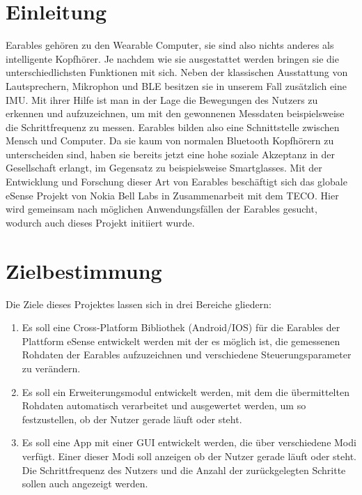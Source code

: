 \documentclass[a4paper,12pt]{article}
\title{\projektName}
\date{\today}
\begin{document}
 \setcounter{page}{2}
 \tableofcontents          %
 \clearpage


\section{Einleitung}
\Gls{Earables} gehören zu den \Gls{Wearable Computer}, sie sind also nichts anderes als intelligente Kopfhörer. Je nachdem wie sie ausgestattet werden bringen sie die unterschiedlichsten Funktionen mit sich. Neben der klassischen Ausstattung von Lautsprechern, Mikrophon und \gls{BLE} besitzen sie in unserem Fall zusätzlich eine \Gls{IMU}. Mit ihrer Hilfe ist man in der Lage die Bewegungen des Nutzers zu erkennen und aufzuzeichnen, um mit den gewonnenen Messdaten  beispielsweise die \Gls{Schrittfrequenz} zu messen.  \Gls{Earables} bilden also eine Schnittstelle zwischen Mensch und Computer. Da sie kaum von normalen Bluetooth Kopfhörern zu unterscheiden sind, haben sie bereits jetzt eine hohe soziale Akzeptanz in der Gesellschaft erlangt, im Gegensatz zu beispielsweise Smartglasses. Mit der Entwicklung und Forschung dieser Art von \Gls{Earables} beschäftigt sich das globale eSense Projekt von Nokia Bell Labs in Zusammenarbeit mit dem TECO. Hier wird gemeinsam nach möglichen Anwendungsfällen der \Gls{Earables} gesucht, wodurch auch dieses Projekt initiiert wurde.
\section{Zielbestimmung}
Die Ziele dieses Projektes lassen sich in drei Bereiche gliedern:
\begin{enumerate}

  \item Es soll eine \Gls{Cross-Platform Bibliothek} (Android/IOS) für die \Gls{Earables} der Plattform eSense entwickelt werden mit der es möglich ist, die gemessenen Rohdaten der \Gls{Earables} aufzuzeichnen und verschiedene \Gls{Steuerungsparameter} zu verändern.
  
  \item Es soll ein Erweiterungsmodul entwickelt werden, mit dem die übermittelten  \Gls{Rohdaten} automatisch verarbeitet und ausgewertet werden, um so festzustellen, ob der Nutzer gerade läuft oder steht.
  
  \item Es soll eine App mit einer \Gls{GUI} entwickelt werden, die über verschiedene Modi verfügt. Einer dieser Modi soll anzeigen ob der Nutzer gerade läuft oder steht. Die \gls{Schrittfrequenz} des Nutzers und die Anzahl der zurückgelegten Schritte sollen auch angezeigt werden.

\end{enumerate}
\end{document}

